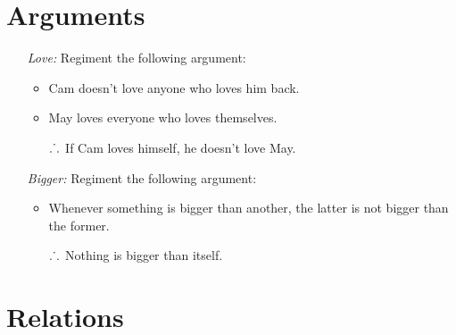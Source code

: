 \documentclass[a4paper, 11pt]{article} %
\def\therefore{\ensuremath{\ldotp\dot{}\,\ldotp}}
\begin{document}
\section*{Arguments}

\begin{enumerate}
  \item[\it Love:] Regiment the following argument:
    \begin{itemize}
      \item Cam doesn't love anyone who loves him back.
      \item May loves everyone who loves themselves.
      \item[\therefore] If Cam loves himself, he doesn't love May.
    \end{itemize}
  \item[\it Bigger:] Regiment the following argument:
    \begin{itemize}
      \item Whenever something is bigger than another, the latter is not bigger than the former.
      \item[\therefore] Nothing is bigger than itself.
    \end{itemize}
\end{enumerate}


\section*{Relations}
\end{document}
